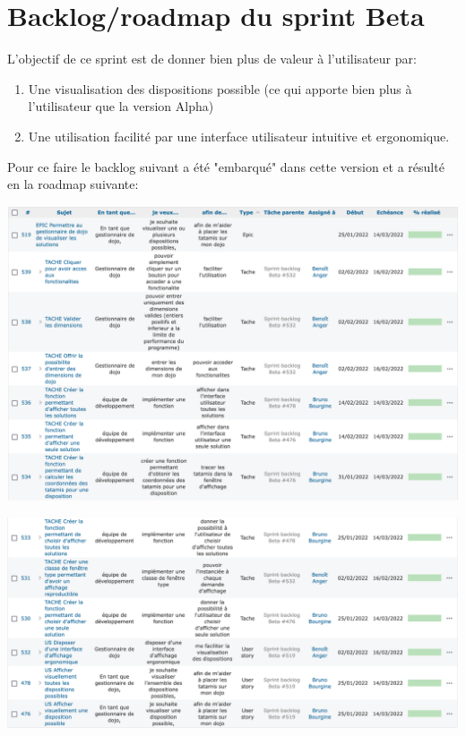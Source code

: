 \section{Backlog/roadmap du sprint Beta}

L’objectif de ce sprint est de donner bien plus de valeur à l'utilisateur par:
\begin{enumerate}
    \item Une visualisation des dispositions possible (ce qui apporte bien plus à l'utilisateur que la version Alpha)
    \item Une utilisation facilité par une interface utilisateur intuitive et ergonomique.
\end{enumerate}

Pour ce faire le backlog suivant a été "embarqué" dans cette version et a résulté en la roadmap suivante:

\begin{center}
    \includegraphics[width=17cm]{images/roadmap-beta-part1.png}
\end{center}

\begin{center}
    \includegraphics[width=17cm]{images/roadmap-beta-part2.png}
\end{center}

